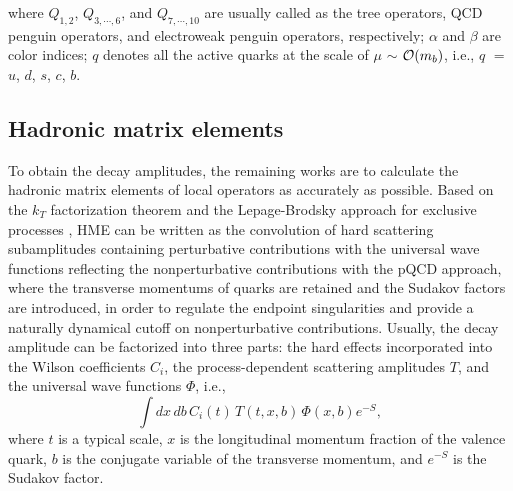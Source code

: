 \documentclass[preprint,superscriptaddress,nofootinbib]{revtex4}
\begin{document}
  where $Q_{1,2}$, $Q_{3,{\cdots},6}$, and $Q_{7,{\cdots},10}$
  are usually called as the tree operators, QCD
  penguin operators, and electroweak penguin operators,
  respectively;
  ${\alpha}$ and ${\beta}$ are color indices;
  $q$ denotes all the active quarks at the scale of
  ${\mu}$ ${\sim}$ ${\cal O}(m_{b})$, i.e.,
  $q$ $=$ $u$, $d$, $s$, $c$, $b$.

  \subsection{Hadronic matrix elements}
  \label{sec0202}
  To obtain the decay amplitudes, the remaining works are
  to calculate the hadronic matrix elements of local
  operators as accurately as possible.
  Based on the $k_{T}$ factorization theorem \cite{npb366}
  and the Lepage-Brodsky approach for exclusive processes \cite{prd22},
  HME can be written as the convolution of hard scattering
  subamplitudes containing perturbative contributions
  with the universal wave functions reflecting the
  nonperturbative contributions with the pQCD approach,
  where the transverse momentums of quarks are retained
  and the Sudakov factors are introduced, in order to regulate
  the endpoint singularities and provide a naturally
  dynamical cutoff on nonperturbative contributions.
  Usually, the decay amplitude can be factorized into three
  parts: the hard effects incorporated into the Wilson
  coefficients $C_{i}$, the process-dependent scattering
  amplitudes $T$, and the
  universal wave functions ${\Phi}$, i.e.,
  \begin{equation}
  {\int} dx\, db\,
  C_{i}(t)\,T(t,x,b)\,{\Phi}(x,b)e^{-S}
  \label{hadronic},
  \end{equation}
  where $t$ is a typical scale, $x$ is the
  longitudinal momentum fraction of the valence quark,
  $b$ is the conjugate variable of the transverse
  momentum, and $e^{-S}$ is the Sudakov factor.

\end{document}

